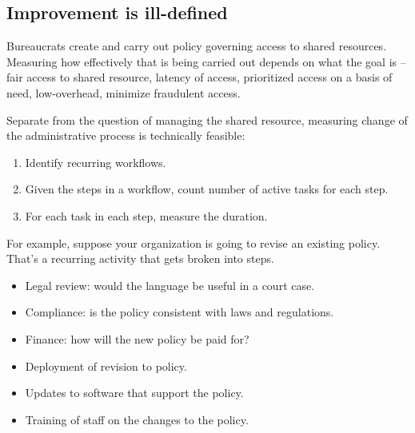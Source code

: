 \subsection{Improvement is ill-defined}

Bureaucrats create and carry out policy governing access to shared resources. Measuring how effectively that is being carried out depends on what the goal is -- fair access to shared resource, latency of access, prioritized access on a basis of need, low-overhead, minimize fraudulent access. 

Separate from the question of managing the shared resource, measuring change of the administrative process is technically feasible:
\begin{enumerate}
    \item Identify recurring workflows.
    \item Given the steps in a workflow, count number of active tasks for each step.
    \item For each task in each step, measure the duration.
\end{enumerate}

For example, suppose your organization is going to revise an existing policy. That's a recurring activity that gets broken into steps. 
\begin{itemize}
    \item Legal review: would the language be useful in a court case.
    \item Compliance: is the policy consistent with laws and regulations.
    \item Finance: how will the new policy be paid for?
    \item Deployment of revision to policy.
    \item Updates to software that support the policy.
    \item Training of staff on the changes to the policy.
\end{itemize}




